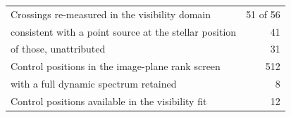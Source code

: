 \begin{tabular}{@{}lr@{}}
\hline
Crossings re-measured in the visibility domain & 51 of 56 \\
\quad consistent with a point source at the stellar position & 41 \\
\quad of those, unattributed & 31 \\
\hline
Control positions in the image-plane rank screen & 512 \\
\quad with a full dynamic spectrum retained & 8 \\
Control positions available in the visibility fit & 12 \\
\hline
\end{tabular}
